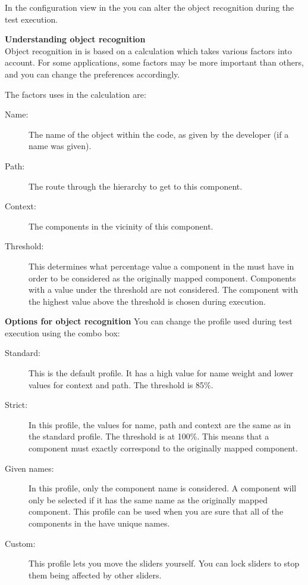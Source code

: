 \label{objectprefs}

In the configuration view in the \gdomeditor{} you can alter the object recognition during the test execution. 


\textbf{Understanding object recognition}\\
Object recognition in \app{} is based on a calculation which takes various factors into account. For some applications, some factors may be more important than others, and you can change the preferences accordingly. 

The factors \app{} uses in the calculation are:

\begin{description}
\item [Name:]{The name of the object within the \gdaut{} code, as given by the developer (if a name was given). }
\item [Path:]{The route through the \gdaut{} hierarchy to get to this component.}
\item [Context:]{The components in the vicinity of this component.}
\item[Threshold:]{This determines what percentage value a component in the \gdaut{} must have in order to be considered as the originally mapped component. Components with a value under the threshold are not considered. The component with the highest value above the threshold is chosen during execution.}
\end{description}

\textbf{Options for object recognition}
You can change the profile used during test execution using the combo box:

\begin{description}
\item[Standard:]{This is the default profile. It has a high value for name weight and lower values for context and path. The threshold is 85\%.}
\item[Strict:]{In this profile, the values for name, path and context are the same as in the standard profile. The threshold is at 100\%. This means that a component must exactly correspond to the originally mapped component.}
\item[Given names:]{In this profile, only the component name is considered. A component will only be selected if it has the same name as the originally mapped component. This profile can be used when you are sure that all of the components in the \gdaut{} have unique names.}
\item[Custom:]{This profile lets you move the sliders yourself. You can lock sliders to stop them being affected by other sliders.}
\end{description}

